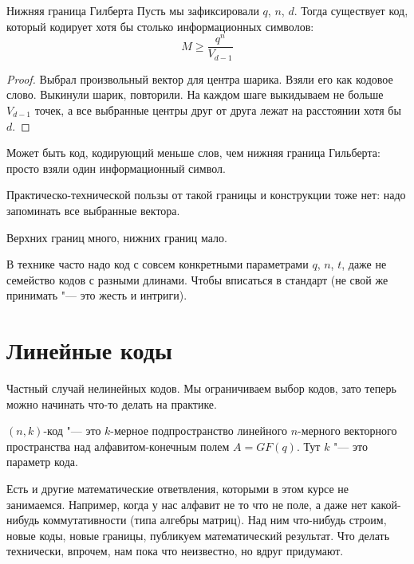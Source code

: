 \begin{lemma}{Нижняя граница Гилберта}
Пусть мы зафиксировали $q$, $n$, $d$.
Тогда существует код, который кодирует хотя бы столько информационных символов:
\[
M \ge \frac{q^n}{V_{d-1}}
\]
\end{lemma}
\begin{proof}
	Выбрал произвольный вектор для центра шарика.
	Взяли его как кодовое слово.
	Выкинули шарик, повторили.
	На каждом шаге выкидываем не больше $V_{d-1}$ точек,
	а все выбранные центры друг от друга лежат на расстоянии
	хотя бы $d$.
\end{proof}
\begin{Rem}
	Может быть код, кодирующий меньше слов, чем нижняя граница Гильберта:
	просто взяли один информационный символ.
\end{Rem}
\begin{Rem}
	Практическо-технической пользы от такой границы и конструкции тоже нет:
	надо запоминать все выбранные вектора.
\end{Rem}

\begin{Rem}
	Верхних границ много, нижних границ мало.
\end{Rem}
\begin{Rem}
	В технике часто надо код с совсем конкретными
	параметрами $q$, $n$, $t$, даже не семейство кодов с разными длинами.
	Чтобы вписаться в стандарт (не свой же принимать "--- это жесть и интриги).
\end{Rem}

\section{Линейные коды}
Частный случай нелинейных кодов.
Мы ограничиваем выбор кодов, зато теперь можно начинать что-то делать на практике.

\begin{Def}
	$(n, k)$-код "--- это $k$-мерное подпространство
	линейного $n$-мерного векторного пространства
	над алфавитом-конечным полем $A=GF(q)$.
	Тут $k$ "--- это параметр кода.
\end{Def}
\begin{Rem}
	Есть и другие математические ответвления, которыми в этом курсе не занимаемся.
	Например, когда у нас алфавит не то что не поле,
	а даже нет какой-нибудь коммутативности
	(типа алгебры матриц).
	Над ним что-нибудь строим, новые коды, новые границы,
	публикуем математический результат.
	Что делать технически, впрочем, нам пока что неизвестно,
	но вдруг придумают.
\end{Rem}

